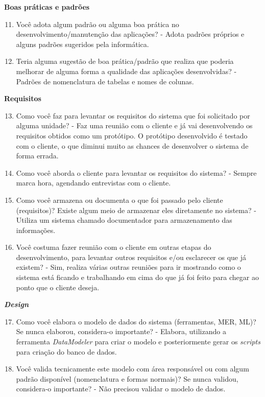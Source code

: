 \begin{anexosenv}
\textbf{Boas práticas e padrões}

\begin{enumerate}
\setcounter{enumi}{10}
\item Você adota algum padrão ou alguma boa prática no desenvolvimento/manutenção das
aplicações?\newline
- Adota padrões próprios e alguns padrões sugeridos pela informática.
\item Teria alguma sugestão de boa prática/padrão que realiza que poderia melhorar de
alguma forma a qualidade das aplicações desenvolvidas?\newline
- Padrões de nomenclatura de tabelas e nomes de colunas.
\end{enumerate}

\textbf{Requisitos}

\begin{enumerate}
\setcounter{enumi}{12}
\item Como você faz para levantar os requisitos do sistema que foi solicitado por alguma
unidade?\newline
- Faz uma reunião com o cliente e já vai desenvolvendo os requisitos obtidos como um protótipo. O protótipo desenvolvido é testado com o cliente, o que diminui muito as chances de desenvolver o sistema de forma errada.
\item Como você aborda o cliente para levantar os requisitos do sistema?\newline
- Sempre marca hora, agendando entrevistas com o cliente.
\item Como você armazena ou documenta o que foi passado pelo cliente (requisitos)? Existe
algum meio de armazenar eles diretamente no sistema?\newline
- Utiliza um sistema chamado documentador para armazenamento das informações.
\item Você costuma fazer reunião com o cliente em outras etapas do desenvolvimento, para
levantar outros requisitos e/ou esclarecer os que já existem?\newline
- Sim, realiza várias outras reuniões para ir mostrando como o sistema está ficando e trabalhando em cima do que já foi feito para chegar ao ponto que o cliente deseja.
\end{enumerate}

\textbf{\textit{Design}}

\begin{enumerate}
\setcounter{enumi}{16}
\item Como você elabora o modelo de dados do sistema (ferramentas, MER, ML)? Se nunca
elaborou, considera-o importante?\newline
- Elabora, utilizando a ferramenta \textit{DataModeler} para criar o modelo e posteriormente gerar os \textit{scripts} para criação do banco de dados.
\item Você valida tecnicamente este modelo com área responsável ou com algum padrão
disponível (nomenclatura e formas normais)? Se nunca validou, considera-o importante?\newline
- Não precisou validar o modelo de dados.
\end{enumerate}


\end{anexosenv}
